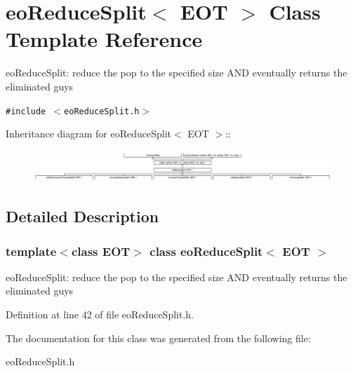 \section{eo\-Reduce\-Split$<$ EOT $>$ Class Template Reference}
\label{classeo_reduce_split}
eo\-Reduce\-Split: reduce the pop to the specified size AND eventually returns the eliminated guys  


{\tt \#include $<$eo\-Reduce\-Split.h$>$}

Inheritance diagram for eo\-Reduce\-Split$<$ EOT $>$::\begin{figure}[H]
\begin{center}
\leavevmode
\includegraphics[height=1.2043cm]{classeo_reduce_split}
\end{center}
\end{figure}


\subsection{Detailed Description}
\subsubsection*{template$<$class EOT$>$ class eo\-Reduce\-Split$<$ EOT $>$}

eo\-Reduce\-Split: reduce the pop to the specified size AND eventually returns the eliminated guys 



Definition at line 42 of file eo\-Reduce\-Split.h.

The documentation for this class was generated from the following file:\begin{CompactItemize}
\item 
eo\-Reduce\-Split.h\end{CompactItemize}
